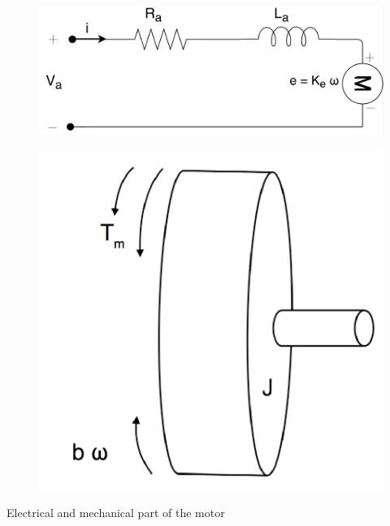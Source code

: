 \begin{table}[H]
	\begin{minipage}[b]{0.49\linewidth}
		\centering
		\begin{figure}[H]
			\centering
			\includegraphics[width=1\linewidth]{figures/BLDC}
		\end{figure}
	\end{minipage}\hfill
	\begin{minipage}[b]{0.49\linewidth}
		\centering
		\begin{figure}[H]
			\centering
			\includegraphics[width=0.55\linewidth]{figures/flywheel_1}
		\end{figure}
	\end{minipage}
	\caption{ Electrical and mechanical part of the motor }
	\label{fig:electromech}
\end{table}

